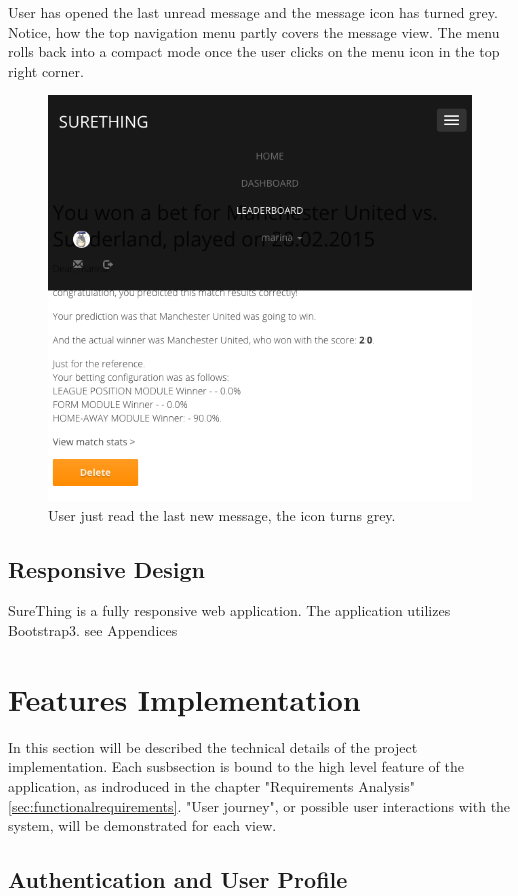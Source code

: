 User has opened the last unread message and the message icon has turned grey. Notice, how the top navigation menu partly covers the message view. The menu rolls back into a compact mode once the user clicks on the menu icon in the top right corner.

\begin{figure}[H]
	\begin{center}
		\includegraphics[width=.60\linewidth,natwidth=610,natheight=642]{impl/images/noMoreNewMessages}
		\caption{User just read the last new message, the icon turns grey.} \label{fig:noMoreNewMessages}
	\end{center}
\end{figure}

\subsection{Responsive Design}
SureThing is a fully responsive web application. The application utilizes Bootstrap3. 
see Appendices


\section{Features Implementation}
In this section will be described the technical details of the project implementation. Each susbsection is bound to the high level feature of the application, as indroduced in the chapter "Requirements Analysis" \ref{sec:functionalrequirements}. "User journey", or possible user interactions with the system, will be demonstrated for each view.

\subsection{Authentication and User Profile}

